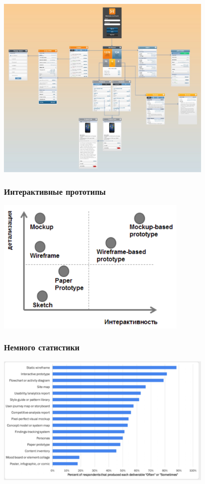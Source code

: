 \documentclass{../../slides-style}
\begin{document}
    \begin{frame}
        \begin{center}
            \includegraphics[width=0.8\textwidth]{screenMap.png}
        \end{center}
    \end{frame}

    \begin{frame}
        \frametitle{Интерактивные прототипы}
        \begin{center}
            \includegraphics[width=0.7\textwidth]{prototypeClassification.png}
        \end{center}
    \end{frame}

    \begin{frame}
        \frametitle{Немного статистики}
        \begin{center}
            \includegraphics[width=0.8\textwidth]{statistics.png}
        \end{center}
    \end{frame}
\end{document}

